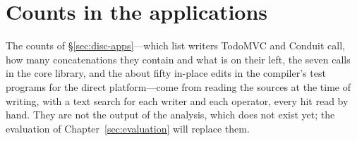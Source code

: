 \section{Counts in the applications}

The counts of \S\ref{sec:disc-apps}---which list writers TodoMVC and Conduit call, how many concatenations
they contain and what is on their left, the seven  calls in the core library, and the
about fifty in-place edits in the compiler's test programs for the direct platform---come from reading
the sources at the time of writing, with a text search for each writer and each operator, every hit read
by hand. They are not the output of the analysis, which does not exist yet; the evaluation of
Chapter~\ref{sec:evaluation} will replace them.
